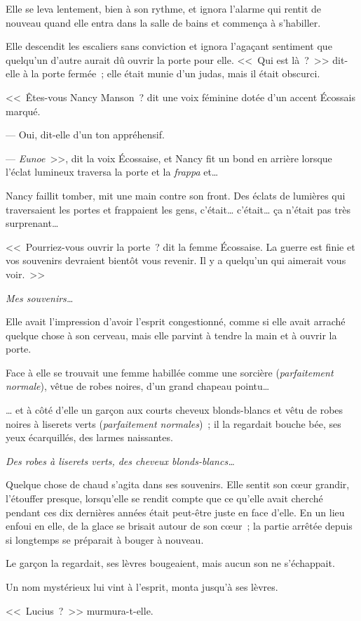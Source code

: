 Elle se leva lentement, bien à son rythme, et ignora l'alarme qui rentit de nouveau quand elle entra dans la salle de bains et commença à s'habiller.

Elle descendit les escaliers sans conviction et ignora l'agaçant sentiment que quelqu'un d'autre aurait dû ouvrir la porte pour elle. <<~Qui est là~?~>> dit-elle à la porte fermée~; elle était munie d'un judas, mais il était obscurci.

<<~Êtes-vous Nancy Manson~? dit une voix féminine dotée d'un accent Écossais marqué.

--- Oui, dit-elle d'un ton appréhensif.

--- \emph{Eunoe}~>>, dit la voix Écossaise, et Nancy fit un bond en arrière lorsque l'éclat lumineux traversa la porte et la \emph{frappa} et…

Nancy faillit tomber, mit une main contre son front. Des éclats de lumières qui traversaient les portes et frappaient les gens, c'était… c'était… ça n'était pas très surprenant…

<<~Pourriez-vous ouvrir la porte~? dit la femme Écossaise. La guerre est finie et vos souvenirs devraient bientôt vous revenir. Il y a quelqu'un qui aimerait vous voir.~>>

\emph{Mes souvenirs…}

Elle avait l'impression d'avoir l'esprit congestionné, comme si elle avait arraché quelque chose à son cerveau, mais elle parvint à tendre la main et à ouvrir la porte.

Face à elle se trouvait une femme habillée comme une sorcière (\emph{parfaitement normale}), vêtue de robes noires, d'un grand chapeau pointu…

… et à côté d'elle un garçon aux courts cheveux blonds-blancs et vêtu de robes noires à liserets verts (\emph{parfaitement normales})~; il la regardait bouche bée, ses yeux écarquillés, des larmes naissantes.

\emph{Des robes à liserets verts, des cheveux blonds-blancs…}

Quelque chose de chaud s'agita dans ses souvenirs. Elle sentit son cœur grandir, l'étouffer presque, lorsqu'elle se rendit compte que ce qu'elle avait cherché pendant ces dix dernières années était peut-être juste en face d'elle. En un lieu enfoui en elle, de la glace se brisait autour de son cœur~; la partie arrêtée depuis si longtemps se préparait à bouger à nouveau.

Le garçon la regardait, ses lèvres bougeaient, mais aucun son ne s'échappait.

Un nom mystérieux lui vint à l'esprit, monta jusqu'à ses lèvres.

<<~Lucius~?~>> murmura-t-elle.

